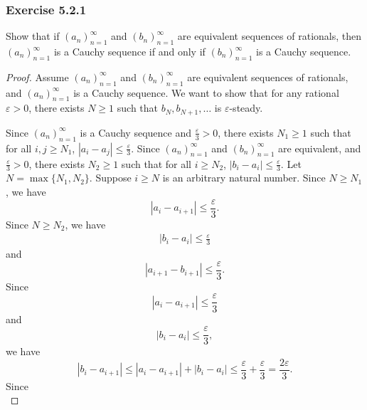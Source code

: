 \documentclass[12pt, letter]{article}
\begin{document}
\subsubsection*{Exercise 5.2.1}
Show that if $(a_n)_{n=1}^\infty$ and $(b_n)_{n=1}^\infty$ are equivalent sequences of rationals, then $(a_n)_{n=1}^\infty$ is a Cauchy sequence if and only if $(b_n)_{n=1}^\infty$
is a Cauchy sequence.
\begin{proof}
    Assume $(a_n)_{n=1}^\infty$ and $(b_n)_{n=1}^\infty$ are equivalent sequences of rationals, and $(a_n)_{n=1}^\infty$ is a Cauchy sequence. We want to show that for any rational 
    $\varepsilon>0$, there exists $N\geq 1$ such that $b_N,b_{N+1},\dotsc$ is $\varepsilon$-steady. 

    Since $(a_n)_{n=1}^\infty$ is a Cauchy sequence and $\frac{\varepsilon}{3}>0$, there exists $N_1\geq 1$ such that for all $i,j\geq N_1$, $|a_i-a_j|\leq \frac{\varepsilon}{3}$.
    Since $(a_n)_{n=1}^\infty$ and $(b_n)_{n=1}^\infty$ are equivalent, and $\frac{\varepsilon}{3}>0$, there exists $N_2\geq 1$ such that for all $i\geq N_2$, $|b_i-a_i|\leq\frac{\varepsilon}{3}$.
    Let $N=\max\{N_1,N_2\}$. Suppose $i\geq N$ is an arbitrary natural number. Since $N\geq N_1$, we have 
    \begin{equation*}
        |a_i-a_{i+1}|\leq \frac{\varepsilon}{3}.
    \end{equation*}
    Since $N\geq N_2$, we have
    \begin{equation*}
        \begin{gathered}
            |b_i-a_i|\leq\frac{\varepsilon}{3}
        \end{gathered}
    \end{equation*}
    and 
    \begin{equation*}
        |a_{i+1}-b_{i+1}|\leq \frac{\varepsilon}{3}.
    \end{equation*}
    Since 
    \begin{equation*}
        |a_i-a_{i+1}|\leq \frac{\varepsilon}{3}
    \end{equation*}
    and 
    \begin{equation*}
        |b_i-a_i|\leq\frac{\varepsilon}{3},
    \end{equation*}
    we have 
    \begin{equation*}
        |b_i-a_{i+1}|\leq |a_i-a_{i+1}|+|b_i-a_i|\leq\frac{\varepsilon}{3}+\frac{\varepsilon}{3}=\frac{2\varepsilon}{3}.
    \end{equation*}
    Since 
    \begin{equation*}

\end{equation*}
\end{proof}
\end{document}
